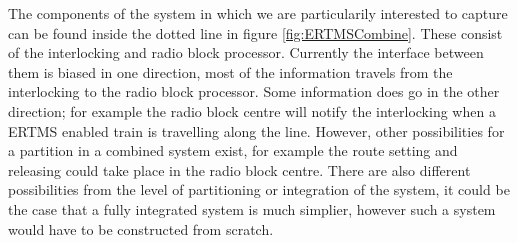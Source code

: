  The components of the system in which we are particularily interested to capture can be found inside the dotted line in figure \ref{fig:ERTMSCombine}. These consist of the interlocking and radio block processor. Currently the interface between them is biased in one direction, most of the information travels from the interlocking to the radio block processor. Some information does go in the other direction; for example the radio block centre will notify the interlocking when a ERTMS enabled train is travelling along the line.  However, other possibilities for a partition in a combined system exist, for example the route setting and releasing could take place in the radio block centre. There are also different possibilities from the level of partitioning or integration of the system, it could be the case that a fully integrated system is much simplier, however such a system would have to be constructed from scratch. 



